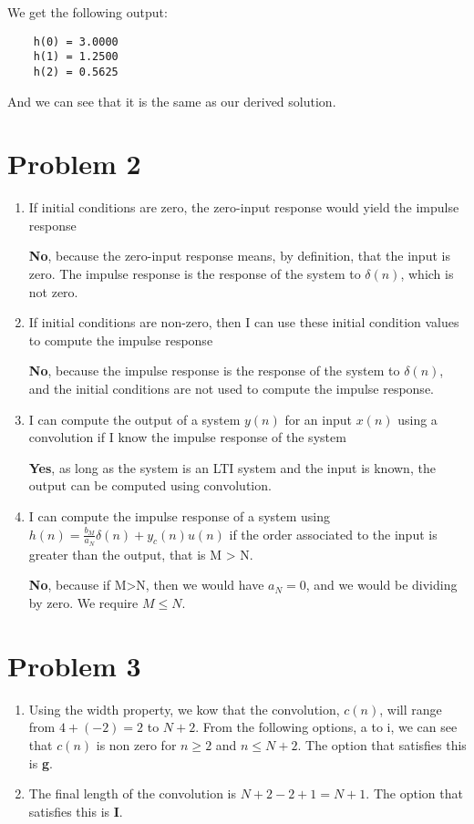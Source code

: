\documentclass{article}
\begin{document}
We get the following output:
\begin{verbatim}
    h(0) = 3.0000
    h(1) = 1.2500
    h(2) = 0.5625
\end{verbatim}

And we can see that it is the same as our derived solution.

\section{Problem 2}

\begin{enumerate}[label=(\alph*)]
    \item If initial conditions are zero, the zero-input response would yield the impulse response
    
    \textbf{No}, because the zero-input response means, by definition, that the input is zero. The impulse response is the response of the system to $\delta(n)$, which is not zero.

    \item If initial conditions are non-zero, then I can use these initial condition values to compute the impulse response 
    
    \textbf{No}, because the impulse response is the response of the system to $\delta(n)$, and the initial conditions are not used to compute the impulse response.

    \item I can compute the output of a system $y(n)$ for an input $x(n)$ using a convolution if I know the impulse response of the system
    
    \textbf{Yes}, as long as the system is an LTI system and the input is known, the output can be computed using convolution.

    \item I can compute the impulse response of a system using $h(n) = \frac{b_M}{a_N}\delta(n) + y_c(n)u(n)$ if the order associated to the input is greater than the output, that is M > N.

    \textbf{No}, because if M>N, then we would have $a_N = 0$, and we would be dividing by zero. We require $M \leq N$.
\end{enumerate}

\section{Problem 3}

\begin{enumerate}[label=(\alph*)]
    \item Using the width property, we kow that the convolution, $c(n)$, will range from $4+(-2) = 2$ to $N+2$. From the following options, a to i, we can see that $c(n)$ is non zero for $n \geq 2$ and $n \leq N+2$. The option that satisfies this is \textbf{g}.
    \item The final length of the convolution is $N+2 - 2 + 1 = N+1$. The option that satisfies this is \textbf{I}.
\end{enumerate}
\end{document}
